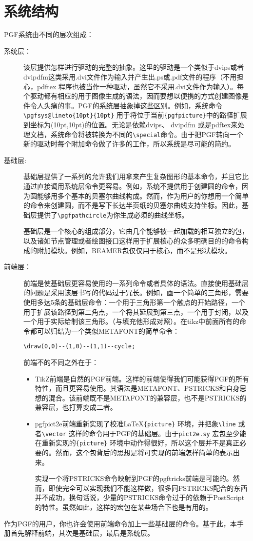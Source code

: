 \section[系统结构]{系统结构}
PGF系统由不同的层次组成：
\begin{description}
\item[系统层：]该层提供怎样进行驱动的完整的抽象。这里的驱动是一个类似于dvips或者dvipdfm这类采用.dvi文件作为输入并产生出.ps或.pdf文件的程序（不用担心，p\-dftex 程序也被当作一种驱动，虽然它不采用.dvi文件作为输入）。每个驱动都有相应的用于图像生成的语法，因而要想以便携的方式创建图像是件令人头痛的事。PGF的系统层抽象掉这些区别。例如，系统命令\lstinline$\pgfsys@lineto{10pt}{10pt}$ 用于将位于当前\lstinline${pgfpicture}$中的路径扩展到坐标为(10pt,10pt)的位置。无论是依赖dvips、 dvipdfm 或是pdftex来处理文档，系统命令将被转换为不同的\lstinline$\special$命令。由于把PGF转向一个新的驱动时每个附加命令做了许多的工作，所以系统是尽可能的简约。
\item[基础层:]基础层提供了一系列的允许我们用拿来产生复杂图形的基本命令，并且它比通过直接调用系统层命令更容易。例如，系统不提供用于创建圆的命令，因为圆能够用多个基本的贝塞尔曲线构成。然而，作为用户的你想用一个简单的命令来创建圆，而不是写下长达半页纸的贝塞尔曲线支持坐标。因此，基础层提供了\lstinline$\pgfpathcircle$为你生成必须的曲线坐标。

基础层是一个核心的组成部分，它由几个能够被一起加载的相互独立的包，以及诸如节点管理或者绘图接口这样用于扩展核心的众多明确目的的命令构成的附加模块。例如，BEAMER包仅仅用于核心，而不是形状模块。
\item[前端层：]前端是使基础层更容易使用的一系列命令或者具体的语法。直接使用基础层的问题是采用该层书写的代码过于冗长。例如，画一个简单的三角形，需要使用多达5条的基础层命令：一个用于三角形第一个触点的开始路径，一个用于扩展该路径到第二角点，一个将其延展到第三点，一个用于封闭，以及一个用于实际给制该三角形。（与填充他形成对照）。在tikz中前面所有的命令都可以归结为一个类似METAFONT的简单命令：
\begin{lstlisting}
\draw(0,0)--(1,0)--(1,1)--cycle;
\end{lstlisting}

前端不的不同之外在于：
\begin{itemize}
\item TikZ前端是自然的PGF前端。这样的前端使得我们可能获得PGF的所有特性，而且更容易使用。其语法是METAFONT、PSTRICKS和自身思想的混合。该前端既不是METAFONT的兼容层，也不是PSTRICKS的兼容层，也打算变成二者。
\item pgfpict2e前端重新实现了校准\LaTeX \lstinline${picture}$ 环境，并把象\lstinline$\line$ 或者\lstinline$\vector$ 这样的命令用于PGF的基础层。由于\lstinline$pict2e.sy$ 宏包至少能在重新实现的\lstinline${picture}$ 环境中动作得很好，所以这个层并不是真正必要的。然而，这个包背后的思想是将可实现的前端怎样简单的表示出来。

实现一个将PSTRICKS命令映射到PGF的pgftricks前端是可能的。然而，即使完全可以实现我们不能这样做，很多同PSTRICKS配合的东西并不成功，换句话说，少量的PSTRICKS命令过于的依赖于PostScript的特性。虽然如此，这样的宏包在某些场合下也是有用的。
\end{itemize}
\end{description}
作为PGF的用户，你也许会使用前端命令加上一些基础层的命令。基于此，本手册首先解释前端，其次是基础层，最后是系统层。
